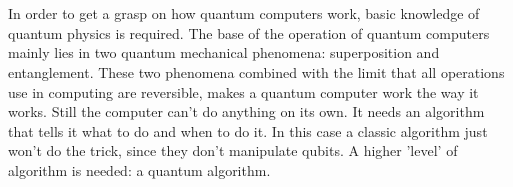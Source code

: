 \chapter{}
\label{ch:stand-van-zaken}






In order to get a grasp on how quantum computers work, basic knowledge of quantum physics is required.
The base of the operation of quantum computers mainly lies in two quantum mechanical phenomena: superposition and entanglement.
These two phenomena combined with the limit that all operations use in computing are reversible, makes a quantum computer work the way it works.
Still the computer can't do anything on its own. It needs an algorithm that tells it what to do and when to do it.
In this case a classic algorithm just won't do the trick, since they don't manipulate qubits. A higher 'level' of algorithm is needed: a quantum algorithm.

